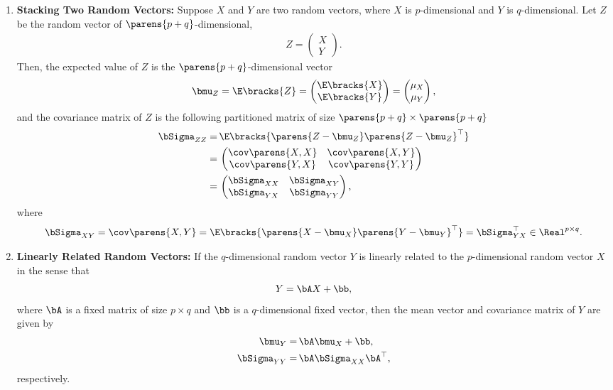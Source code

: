 \documentclass[12pt]{article}
\begin{document}
\begin{enumerate}[label=\textbf{\arabic*.}]
	\item \textbf{Stacking Two Random Vectors:} Suppose $X$ and $Y$ are two random vectors, where $X$ is $p$-dimensional and $Y$ is $q$-dimensional. Let $Z$ be the random vector of $\parens{p+q}$-dimensional, 
	\begin{align*}
		Z = \begin{pmatrix}
			X \\ Y
		\end{pmatrix}. 
	\end{align*}
	Then, the expected value of $Z$ is the $\parens{p+q}$-dimensional vector 
	\begin{align*}
		\bmu_Z = \E \bracks{Z} = \begin{pmatrix}
			\E \bracks{X} \\ \E \bracks{Y}
		\end{pmatrix} = \begin{pmatrix}
			\mu_X \\ \mu_Y
		\end{pmatrix}, 
	\end{align*}
	and the covariance matrix of $Z$ is the following partitioned matrix of size $ \parens{ p + q} \times \parens{p + q} $ 
	\begin{align*}
		\bSigma_{ZZ} = & \, \E \bracks{\parens{Z - \bmu_Z} \parens{Z - \bmu_Z}^\top} \\ 
		= & \, \begin{pmatrix}
			\cov \parens{X, X} & \cov \parens{X, Y} \\ 
			\cov \parens{Y, X} & \cov \parens{Y, Y}
		\end{pmatrix} \\ 
		= & \, \begin{pmatrix}
			\bSigma_{XX} & \bSigma_{XY} \\ 
			\bSigma_{YX} & \bSigma_{YY}
		\end{pmatrix}, 
	\end{align*}
	where 
	\begin{align*}
		\bSigma_{XY} = \cov \parens{X, Y} = \E \bracks{\parens{X - \bmu_X} \parens{Y - \bmu_Y}^\top} = \bSigma_{YX}^\top \in \Real^{p \times q}. 
	\end{align*}
	
	\item \textbf{Linearly Related Random Vectors:} If the $q$-dimensional random vector $Y$ is linearly related to the $p$-dimensional random vector $X$ in the sense that 
	\begin{align*}
		Y = \bA X + \bb, 
	\end{align*}
	where $\bA$ is a fixed matrix of size $p \times q$ and $\bb$ is a $q$-dimensional fixed vector, then the mean vector and covariance matrix of $Y$ are given by 
	\begin{align*}
		\bmu_Y = & \, \bA \bmu_X + \bb, \\ 
		\bSigma_{YY} = & \, \bA \bSigma_{XX} \bA^\top, 
	\end{align*}
	respectively. 

\end{enumerate}
\end{document}

